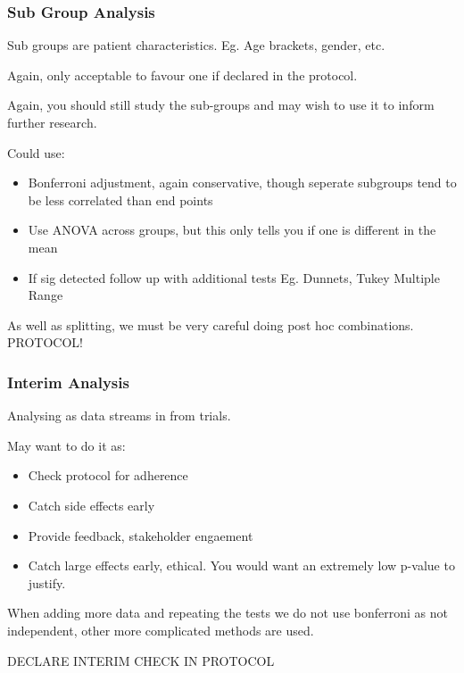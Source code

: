 \documentclass[
  letterpaper,
  DIV=11,
  numbers=noendperiod]{scrreprt}
\providecommand{\tightlist}{%
  \setlength{\itemsep}{0pt}\setlength{\parskip}{0pt}}\usepackage{longtable,booktabs,array}
\begin{document}
\hypertarget{sub-group-analysis}{%
\subsubsection{Sub Group Analysis}\label{sub-group-analysis}}

Sub groups are patient characteristics. Eg. Age brackets, gender, etc.

Again, only acceptable to favour one if declared in the protocol.

Again, you should still study the sub-groups and may wish to use it to
inform further research.

Could use:

\begin{itemize}
\tightlist
\item
  Bonferroni adjustment, again conservative, though seperate subgroups
  tend to be less correlated than end points
\item
  Use ANOVA across groups, but this only tells you if one is different
  in the mean
\item
  If sig detected follow up with additional tests Eg. Dunnets, Tukey
  Multiple Range
\end{itemize}

As well as splitting, we must be very careful doing post hoc
combinations. PROTOCOL!

\hypertarget{interim-analysis}{%
\subsubsection{Interim Analysis}\label{interim-analysis}}

Analysing as data streams in from trials.

May want to do it as:

\begin{itemize}
\tightlist
\item
  Check protocol for adherence
\item
  Catch side effects early
\item
  Provide feedback, stakeholder engaement
\item
  Catch large effects early, ethical. You would want an extremely low
  p-value to justify.
\end{itemize}

When adding more data and repeating the tests we do not use bonferroni
as not independent, other more complicated methods are used.

DECLARE INTERIM CHECK IN PROTOCOL
\end{document}
